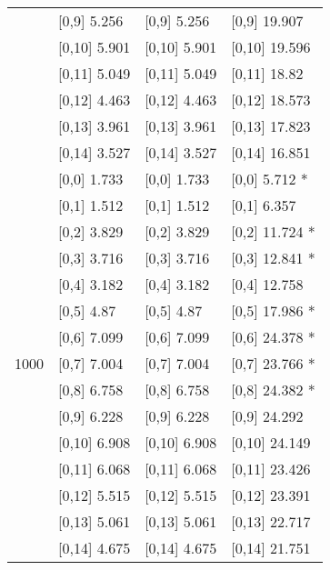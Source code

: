 \begin{table}
\begin{tabular}[t]{llll}
 & {}[0,9] 5.256 & {}[0,9] 5.256 & {}[0,9] 19.907\\
\addlinespace
 & {}[0,10] 5.901 & {}[0,10] 5.901 & {}[0,10] 19.596\\
 & {}[0,11] 5.049 & {}[0,11] 5.049 & {}[0,11] 18.82\\
 & {}[0,12] 4.463 & {}[0,12] 4.463 & {}[0,12] 18.573\\
 & {}[0,13] 3.961 & {}[0,13] 3.961 & {}[0,13] 17.823\\
 & {}[0,14] 3.527 & {}[0,14] 3.527 & {}[0,14] 16.851\\
\addlinespace
 & {}[0,0] 1.733 & {}[0,0] 1.733 & {}[0,0] 5.712 *\\
 & {}[0,1] 1.512 & {}[0,1] 1.512 & {}[0,1] 6.357\\
 & {}[0,2] 3.829 & {}[0,2] 3.829 & {}[0,2] 11.724 *\\
 & {}[0,3] 3.716 & {}[0,3] 3.716 & {}[0,3] 12.841 *\\
 & {}[0,4] 3.182 & {}[0,4] 3.182 & {}[0,4] 12.758\\
\addlinespace
 & {}[0,5] 4.87 & {}[0,5] 4.87 & {}[0,5] 17.986 *\\
 & {}[0,6] 7.099 & {}[0,6] 7.099 & {}[0,6] 24.378 *\\
1000 & {}[0,7] 7.004 & {}[0,7] 7.004 & {}[0,7] 23.766 *\\
 & {}[0,8] 6.758 & {}[0,8] 6.758 & {}[0,8] 24.382 *\\
 & {}[0,9] 6.228 & {}[0,9] 6.228 & {}[0,9] 24.292\\
\addlinespace
 & {}[0,10] 6.908 & {}[0,10] 6.908 & {}[0,10] 24.149\\
 & {}[0,11] 6.068 & {}[0,11] 6.068 & {}[0,11] 23.426\\
 & {}[0,12] 5.515 & {}[0,12] 5.515 & {}[0,12] 23.391\\
 & {}[0,13] 5.061 & {}[0,13] 5.061 & {}[0,13] 22.717\\
 & {}[0,14] 4.675 & {}[0,14] 4.675 & {}[0,14] 21.751\\
\bottomrule
\end{tabular}
\end{table}
